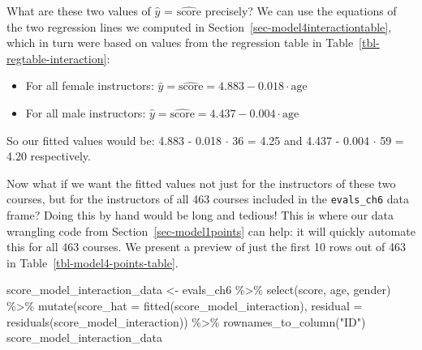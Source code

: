 \documentclass[
  letterpaper,
  DIV=11,
  numbers=noendperiod]{scrreprt}
\newenvironment{Shaded}{\begin{snugshade}}{\end{snugshade}}
\newcommand{\AttributeTok}[1]{\textcolor[rgb]{0.40,0.45,0.13}{#1}}
\newcommand{\FunctionTok}[1]{\textcolor[rgb]{0.28,0.35,0.67}{#1}}
\newcommand{\NormalTok}[1]{\textcolor[rgb]{0.00,0.23,0.31}{#1}}
\newcommand{\OtherTok}[1]{\textcolor[rgb]{0.00,0.23,0.31}{#1}}
\newcommand{\SpecialCharTok}[1]{\textcolor[rgb]{0.37,0.37,0.37}{#1}}
\newcommand{\StringTok}[1]{\textcolor[rgb]{0.13,0.47,0.30}{#1}}
\providecommand{\tightlist}{%
  \setlength{\itemsep}{0pt}\setlength{\parskip}{0pt}}\usepackage{longtable,booktabs,array}
\theoremstyle{definition}
\theoremstyle{remark}
\begin{document}
What are these two values of \(\widehat{y}\) =
\(\widehat{\text{score}}\) precisely? We can use the equations of the
two regression lines we computed in
Section~\ref{sec-model4interactiontable}, which in turn were based on
values from the regression table in
Table~\ref{tbl-regtable-interaction}:

\begin{itemize}
\tightlist
\item
  For all female instructors:
  \(\widehat{y} = \widehat{\text{score}} = 4.883 - 0.018 \cdot \mbox{age}\)
\item
  For all male instructors:
  \(\widehat{y} = \widehat{\text{score}} = 4.437 - 0.004 \cdot \mbox{age}\)
\end{itemize}

So our fitted values would be: 4.883 - 0.018 \(\cdot\) 36 = 4.25 and
4.437 - 0.004 \(\cdot\) 59 = 4.20 respectively.

Now what if we want the fitted values not just for the instructors of
these two courses, but for the instructors of all 463 courses included
in the \texttt{evals\_ch6} data frame? Doing this by hand would be long
and tedious! This is where our data wrangling code from
Section~\ref{sec-model1points} can help: it will quickly automate this
for all 463 courses. We present a preview of just the first 10 rows out
of 463 in Table~\ref{tbl-model4-points-table}.

\begin{Shaded}
\begin{Highlighting}[]
\NormalTok{score\_model\_interaction\_data }\OtherTok{\textless{}{-}}\NormalTok{ evals\_ch6 }\SpecialCharTok{\%\textgreater{}\%} 
  \FunctionTok{select}\NormalTok{(score, age, gender) }\SpecialCharTok{\%\textgreater{}\%} 
  \FunctionTok{mutate}\NormalTok{(}\AttributeTok{score\_hat =} \FunctionTok{fitted}\NormalTok{(score\_model\_interaction),}
         \AttributeTok{residual =} \FunctionTok{residuals}\NormalTok{(score\_model\_interaction)) }\SpecialCharTok{\%\textgreater{}\%} 
  \FunctionTok{rownames\_to\_column}\NormalTok{(}\StringTok{"ID"}\NormalTok{)}
\NormalTok{score\_model\_interaction\_data}
\end{Highlighting}
\end{Shaded}
\end{document}
